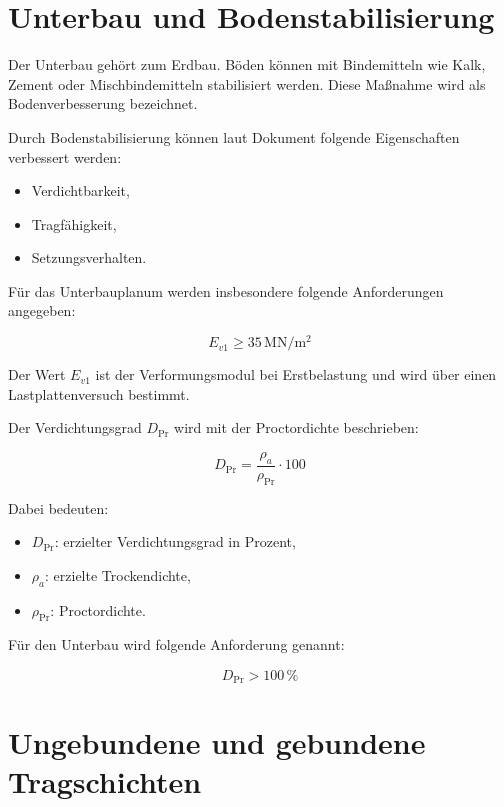 \documentclass[
  12pt,
  a4paper,
  oneside
]{scrreprt}
\begin{document}
\section{Unterbau und Bodenstabilisierung}

Der Unterbau gehört zum Erdbau. Böden können mit Bindemitteln wie Kalk,
Zement oder Mischbindemitteln stabilisiert werden. Diese Maßnahme wird
als Bodenverbesserung bezeichnet.


Durch Bodenstabilisierung können laut Dokument folgende Eigenschaften
verbessert werden:

\begin{itemize}
  \item Verdichtbarkeit,
  \item Tragfähigkeit,
  \item Setzungsverhalten.
\end{itemize}



Für das Unterbauplanum werden insbesondere folgende Anforderungen
angegeben:

\begin{equation}
  E_{v1} \geq 35\,\mathrm{MN/m^2}
\end{equation}

Der Wert $E_{v1}$ ist der Verformungsmodul bei Erstbelastung und wird
über einen Lastplattenversuch bestimmt.


Der Verdichtungsgrad $D_{\mathrm{Pr}}$ wird mit der Proctordichte
beschrieben:

\begin{equation}
  D_{\mathrm{Pr}}
  =
  \frac{\rho_a}{\rho_{\mathrm{Pr}}}
  \cdot 100
\end{equation}

Dabei bedeuten:

\begin{itemize}
  \item $D_{\mathrm{Pr}}$: erzielter Verdichtungsgrad in Prozent,
  \item $\rho_a$: erzielte Trockendichte,
  \item $\rho_{\mathrm{Pr}}$: Proctordichte.
\end{itemize}

Für den Unterbau wird folgende Anforderung genannt:

\begin{equation}
  D_{\mathrm{Pr}} > 100\,\%
\end{equation}



\section{Ungebundene und gebundene Tragschichten}
\end{document}
